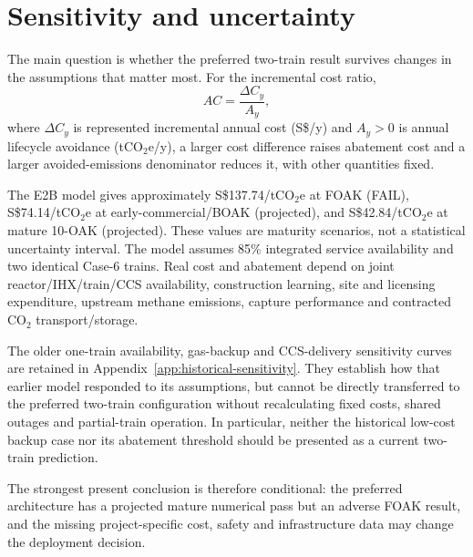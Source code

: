 \section{Sensitivity and uncertainty}\label{sec:sensitivity}
The main question is whether the preferred two-train result survives changes in the assumptions that matter most. For the incremental cost ratio,
\[
AC=\frac{\Delta C_y}{A_y},
\]
where $\Delta C_y$ is represented incremental annual cost (S\$/y) and $A_y>0$ is annual lifecycle avoidance (tCO$_2$e/y), a larger cost difference raises abatement cost and a larger avoided-emissions denominator reduces it, with other quantities fixed.

The E2B model gives approximately S\$137.74/tCO$_2$e at FOAK (FAIL), S\$74.14/tCO$_2$e at early-commercial/BOAK (projected), and S\$42.84/tCO$_2$e at mature 10-OAK (projected). These values are maturity scenarios, not a statistical uncertainty interval. The model assumes 85\% integrated service availability and two identical Case-6 trains. Real cost and abatement depend on joint reactor/IHX/train/CCS availability, construction learning, site and licensing expenditure, upstream methane emissions, capture performance and contracted CO$_2$ transport/storage.

The older one-train availability, gas-backup and CCS-delivery sensitivity curves are retained in Appendix~\ref{app:historical-sensitivity}. They establish how that earlier model responded to its assumptions, but cannot be directly transferred to the preferred two-train configuration without recalculating fixed costs, shared outages and partial-train operation. In particular, neither the historical low-cost backup case nor its abatement threshold should be presented as a current two-train prediction.

\UncertaintyDriversFigure

The strongest present conclusion is therefore conditional: the preferred architecture has a projected mature numerical pass but an adverse FOAK result, and the missing project-specific cost, safety and infrastructure data may change the deployment decision.
